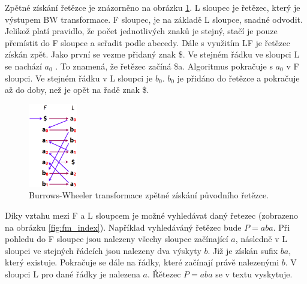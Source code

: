 \documentclass[czech,DP]{thesiskiv}
\numberwithin{equation}{section}
\begin{document}
\noindent
Zpětné získání řetězce je znázorněno na obrázku \ref{fig:bw_transform_inverse}. L sloupec je řetězec, který je výstupem BW transformace. F sloupec, je na základě L sloupce, snadné odvodit. Jelikož platí pravidlo, že počet jednotlivých znaků je stejný, stačí je pouze přemístit do F sloupce a seřadit podle abecedy. Dále s využitím LF je řetězec získán zpět. Jako první se vezme přidaný znak \$. Ve stejném řádku ve sloupci L se nachází $a_0$ . To znamená, že řetězec začíná \$a. Algoritmus pokračuje s $a_0$ v F sloupci. Ve stejném řádku v L sloupci je $b_0$. $b_0$ je přidáno do řetězce a pokračuje až do doby, než je opět na řadě znak \$. 


\begin{figure}[H]		
		\centering
		\includegraphics[width=80px]{./img/BWT_3.png}
		\caption{Burrows-Wheeler transformace zpětné získání původního řetězce. \cite{bw_transform}}
		\label{fig:bw_transform_inverse}
\end{figure}

\noindent
Díky vztahu mezi F a L sloupcem je možné vyhledávat daný řetezec (zobrazeno na obrázku \ref{fig:fm_index}). Například vyhledáváný řetězec bude $P = aba$. Při pohledu do F sloupce jsou nalezeny všechy sloupce začínající $a$, následně v L sloupci ve stejných řádcích jsou nalezeny dva výskyty $b$. Již je získán sufix $ba$, který existuje. Pokračuje se dále na řádky, které začínají právě nalezenými $b$. V sloupci L pro dané řádky je nalezena $a$. Řětezec $P = aba$ se v textu vyskytuje. 
\end{document}
